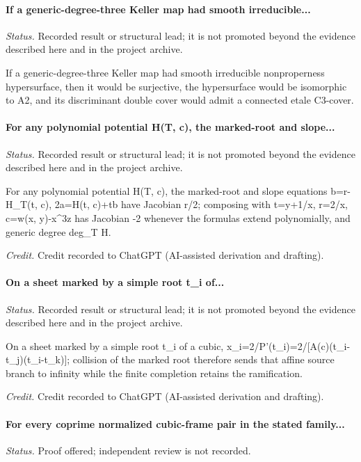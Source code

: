 \label{supp-note-01-024}
\paragraph{If a generic-degree-three Keller map had smooth irreducible...}
\emph{Status.} Recorded result or structural lead; it is not promoted beyond the evidence described here and in the project archive.

If a generic-degree-three Keller map had smooth irreducible nonproperness hypersurface, then it would be surjective, the hypersurface would be isomorphic to A2, and its discriminant double cover would admit a connected etale C3-cover.

\label{supp-note-01-025}
\paragraph{For any polynomial potential H(T, c), the marked-root and slope...}
\emph{Status.} Recorded result or structural lead; it is not promoted beyond the evidence described here and in the project archive.

For any polynomial potential H(T, c), the marked-root and slope equations b=r-H\_T(t, c), 2a=H(t, c)+tb have Jacobian r/2; composing with t=y+1/x, r=2/x, c=w(x, y)-x\textasciicircum{}3z has Jacobian -2 whenever the formulas extend polynomially, and generic degree deg\_T H.

\emph{Credit.} Credit recorded to ChatGPT (AI-assisted derivation and drafting).

\label{supp-note-01-026}
\paragraph{On a sheet marked by a simple root t\_i of...}
\emph{Status.} Recorded result or structural lead; it is not promoted beyond the evidence described here and in the project archive.

On a sheet marked by a simple root t\_i of a cubic, x\_i=2/P'(t\_i)=2/[A(c)(t\_i-t\_j)(t\_i-t\_k)]; collision of the marked root therefore sends that affine source branch to infinity while the finite completion retains the ramification.

\emph{Credit.} Credit recorded to ChatGPT (AI-assisted derivation and drafting).

\label{supp-note-01-027}
\paragraph{For every coprime normalized cubic-frame pair in the stated family...}
\emph{Status.} Proof offered; independent review is not recorded.

